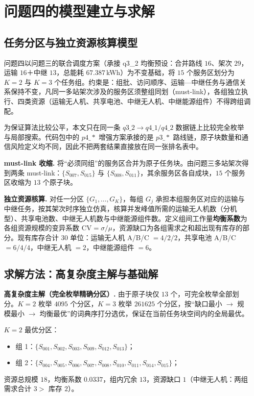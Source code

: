 \section{问题四的模型建立与求解}

\subsection{任务分区与独立资源核算模型}

问题四以问题三的联合调度方案（承接 q3\_2 均衡预设：合并路线 $16$、架次 $29$，运输 $16$＋中继 $13$，总能耗 $67.387\,$kWh）为不变基础，将 $15$ 个服务区划分为 $K=2$ 与 $K=3$ 个任务组。约束是：组批、访问顺序、运输—中继任务与通信关系保持不变，凡同一多站架次涉及的服务区须整组同划（must-link），各组独立执行、四类资源（运输无人机、共享电池、中继无人机、中继能源组件）不得跨组调配。

为保证算法比较公平，本文只在同一条 $q3\_2\to q4\_1/q4\_2$ 数据链上比较完全枚举与局部搜索。代码包中的 $p4\_\ast$ 增强方案承接的是 $p3\_\ast$ 路线链，原子块数量和通信风险定义均不同，因此不把两套结果直接放在同一张排名表中。

\textbf{must-link 收缩.} 将“必须同组”的服务区合并为原子任务块。由问题三多站架次得到两条 must-link：$\{S_{007},S_{015}\}$ 与 $\{S_{008},S_{011}\}$，其余服务区各自成块，$15$ 个服务区收缩为 $13$ 个原子块。

\textbf{独立资源核算.} 对任一分区 $\{G_1,\dots,G_K\}$，每组 $G_j$ 承担本组服务区对应的运输与中继任务，按其架次时序独立仿真，核算并发峰值所需的运输无人机数（分机型）、共享电池数、中继无人机数与中继能源组件数。定义组间工作量\textbf{均衡系数}为各组资源规模的变异系数 $\mathrm{CV}=\sigma/\mu$，资源缺口为各组需求之和超出现有库存的部分。现有库存合计 $30$ 单位：运输无人机 A/B/C $=4/2/2$，共享电池 A/B/C $=6/4/4$，中继无人机 $=2$，中继能源组件 $=6$。

\subsection{求解方法：高复杂度主解与基础解}

\textbf{高复杂度主解（完全枚举精确分区）.} 由于原子块仅 $13$ 个，可完全枚举全部划分。$K=2$ 枚举 $4095$ 个分区，$K=3$ 枚举 $261625$ 个分区，按“缺口最小 $\to$ 规模最小 $\to$ 均衡最优”的词典序打分选优，保证在当前任务块空间内的全局最优。

$K=2$ 最优分区：
\begin{itemize}[leftmargin=2em]
  \item 组 1：$\{S_{001},S_{002},S_{003},S_{009},S_{012},S_{013}\}$；
  \item 组 2：$\{S_{004},S_{005},S_{006},S_{007},S_{008},S_{010},S_{011},S_{014},S_{015}\}$；
\end{itemize}
资源总规模 $18$，均衡系数 $0.0337$，组内冗余 $13$，资源缺口 $1$（中继无人机：两组需求合计 $3>$ 库存 $2$）。

